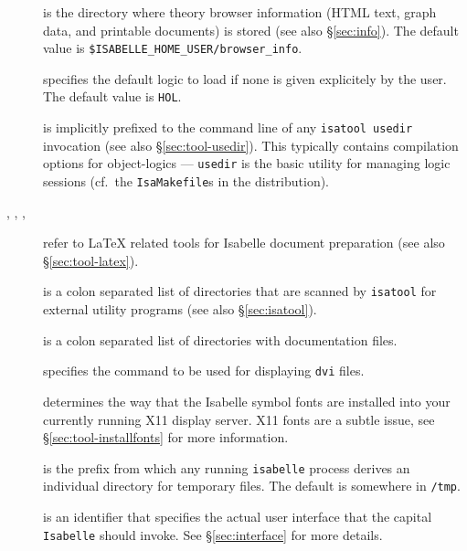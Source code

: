 \begin{description}
\item[] is the directory where theory browser
  information (HTML text, graph data, and printable documents) is stored (see
  also \S\ref{sec:info}).  The default value is
  \texttt{\$ISABELLE_HOME_USER/browser_info}.
  
\item[] specifies the default logic to load if none is
  given explicitely by the user.  The default value is \texttt{HOL}.
  
\item[] is implicitly prefixed to the command
  line of any \texttt{isatool usedir} invocation (see also
  \S\ref{sec:tool-usedir}). This typically contains compilation options for
  object-logics --- \texttt{usedir} is the basic utility for managing logic
  sessions (cf.\ the \texttt{IsaMakefile}s in the distribution).
  
\item[, ,
  , ] refer to {\LaTeX} related
  tools for Isabelle document preparation (see also \S\ref{sec:tool-latex}).
  
\item[] is a colon separated list of directories that
  are scanned by \texttt{isatool} for external utility programs (see also
  \S\ref{sec:isatool}).
  
\item[] is a colon separated list of directories with
  documentation files.
  
\item[] specifies the command to be used for displaying
  \texttt{dvi} files.
  
\item[] determines the way that the Isabelle
  symbol fonts are installed into your currently running X11 display server.
  X11 fonts are a subtle issue, see \S\ref{sec:tool-installfonts} for more
  information.
  
\item[] is the prefix from which any running
  \texttt{isabelle} process derives an individual directory for temporary
  files.  The default is somewhere in \texttt{/tmp}.
  
\item[] is an identifier that specifies the actual
  user interface that the capital \texttt{Isabelle} should invoke.  See
  \S\ref{sec:interface} for more details.

\end{description}


